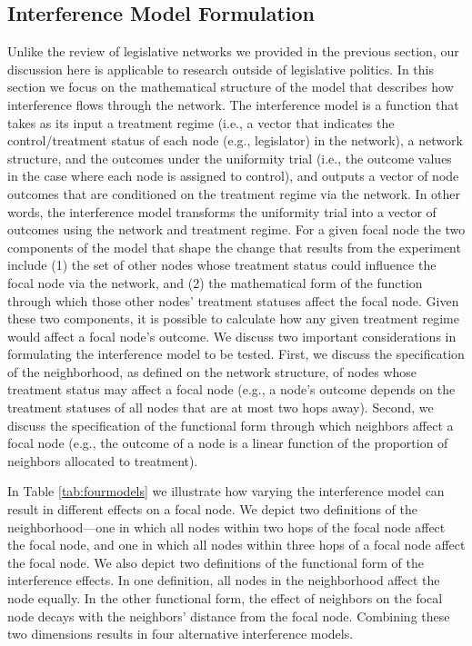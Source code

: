 \documentclass[12pt]{article}
\begin{document}
\subsection{Interference Model Formulation}

Unlike the review of legislative networks we provided in the previous section, our discussion here is applicable to research outside of legislative politics. In this section we focus on the mathematical structure of the model that describes how interference flows through the network. The interference model is a function that takes as its input a treatment regime (i.e., a vector that indicates the control/treatment status of each node (e.g., legislator) in the network), a network structure, and the outcomes under the uniformity trial (i.e., the outcome values in the case where each node is assigned to control), and outputs a vector of node outcomes that are conditioned on the treatment regime via the network. In other words, the interference model transforms the uniformity trial into a vector of outcomes using the network and treatment regime. For a given focal node the two components of the model that shape the change that results from the experiment include (1) the set of other nodes whose treatment status could influence the focal node via the network, and (2) the mathematical form of the function through which those other nodes' treatment statuses affect the focal node. Given these two components, it is possible to calculate how any given treatment regime would affect a focal node's outcome. We discuss two important considerations in formulating the interference model to be tested. First, we discuss the specification of the neighborhood, as defined on the network structure, of nodes whose treatment status may affect a focal node (e.g., a node's outcome depends on the treatment statuses of all nodes that are at most two hops away). Second, we discuss the specification of the functional form through which neighbors affect a focal node (e.g., the outcome of a node is a linear function of the proportion of neighbors allocated to treatment).

In Table \ref{tab:fourmodels} we illustrate how varying the interference model can result in different effects on a focal node. We depict two definitions of the neighborhood---one in which all nodes within two hops of the focal node affect the focal node, and one in which all nodes within three hops of a focal node affect the focal node. We also depict two definitions of the functional form of the interference effects. In one definition, all nodes in the neighborhood affect the node equally. In the other functional form, the effect of neighbors on the focal node decays with the neighbors' distance from the focal node. Combining these two dimensions results in four alternative interference models. 
\end{document}
